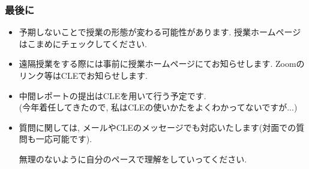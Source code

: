\documentclass[11pt,dvipdfmx]{beamer}
\theoremstyle{definition}
\theoremstyle{remark}
\begin{document}
\begin{frame}
\frametitle{最後に}
 \begin{itemize}

 \item 予期しないことで授業の形態が変わる可能性があります.
 授業ホームページはこまめにチェックしてください.
 
 \item  遠隔授業をする際には事前に授業ホームページにてお知らせします.
Zoomのリンク等はCLEでお知らせします.

 \item 中間レポートの提出はCLEを用いて行う予定です. \\
 {\scriptsize (今年着任してきたので, 私はCLEの使いかたをよくわかってないですが...)}
 
\item 質問に関しては, メールやCLEのメッセージでも対応いたします(対面での質問も一応可能です).

  \begin{alertblock}{}
  \begin{center}
無理のないように自分のペースで理解をしていってください. \\
  \end{center}
 \end{alertblock}


 \end{itemize}

\end{frame}
\end{document}
